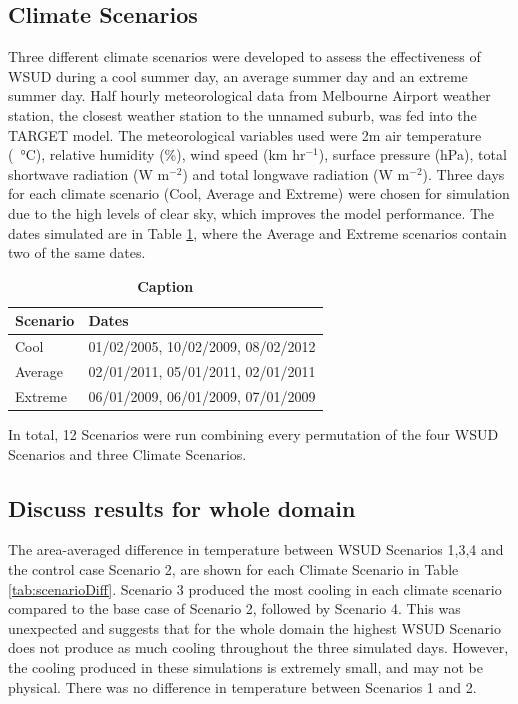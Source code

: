 \documentclass[final,3p,times,authoryear]{elsarticle}
\begin{document}
\subsection{Climate Scenarios}\label{sec:2}

Three different climate scenarios were developed to assess the effectiveness of WSUD during a cool summer day, an average summer day and an extreme summer day. Half hourly meteorological data from Melbourne Airport weather station, the closest weather station to the unnamed suburb, was fed into the TARGET model. The meteorological variables used were 2m air temperature (\SI{}{\degreeCelsius}), relative humidity (\%), wind speed (km hr$^{-1}$), surface pressure (hPa), total shortwave radiation (W m$^{-2}$) and total longwave radiation (W m$^{-2}$). Three days for each climate scenario (Cool, Average and Extreme) were chosen for simulation due to the high levels of clear sky, which improves the model performance. The dates simulated are in Table \ref{tab:dates}, where the Average and Extreme scenarios contain two of the same dates.



\begin{table}[!htbp]
\caption{\bf Caption  \label{tab:dates}}     
\begin{tabular}{ l l}
\textbf{Scenario} & \textbf{Dates}\\ \hline
Cool & 01/02/2005, 10/02/2009, 08/02/2012 \\ 
Average & 02/01/2011, 05/01/2011, 02/01/2011 \\ 
Extreme & 06/01/2009, 06/01/2009, 07/01/2009 \\ 
\hline
\end{tabular}
\end{table}




In total, 12 Scenarios were run combining every permutation of the four WSUD Scenarios and three Climate Scenarios.

\subsection{Discuss results for whole domain}\label{sec:3}


The area-averaged difference in temperature between WSUD Scenarios 1,3,4 and the control case Scenario 2, are shown for each Climate Scenario in Table \ref{tab:scenarioDiff}. Scenario 3 produced the most cooling in each climate scenario compared to the base case of Scenario 2, followed by Scenario 4. This was unexpected and suggests that for the whole domain the highest WSUD Scenario does not produce as much cooling throughout the three simulated days. However, the cooling produced in these simulations is extremely small, and may not be physical. There was no difference in temperature between Scenarios 1 and 2. 
\end{document}
